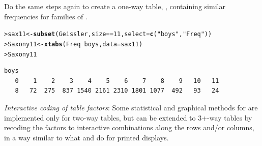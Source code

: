 \documentclass[11pt]{report}\usepackage[]{graphicx}\usepackage[]{color}
\makeatletter
\newcommand{\hlnum}[1]{\textcolor[rgb]{0.686,0.059,0.569}{#1}}%
\newcommand{\hlstr}[1]{\textcolor[rgb]{0.192,0.494,0.8}{#1}}%
\newcommand{\hlopt}[1]{\textcolor[rgb]{0,0,0}{#1}}%
\newcommand{\hlstd}[1]{\textcolor[rgb]{0.345,0.345,0.345}{#1}}%
\newcommand{\hlkwb}[1]{\textcolor[rgb]{0.69,0.353,0.396}{#1}}%
\newcommand{\hlkwc}[1]{\textcolor[rgb]{0.333,0.667,0.333}{#1}}%
\newcommand{\hlkwd}[1]{\textcolor[rgb]{0.737,0.353,0.396}{\textbf{#1}}}%
\newenvironment{kframe}{%
 \def\at@end@of@kframe{}%
 \ifinner\ifhmode%
  \def\at@end@of@kframe{\end{minipage}}%
  \begin{minipage}{\columnwidth}%
 \fi\fi%
 \def\FrameCommand##1{\hskip\@totalleftmargin \hskip-\fboxsep
 \colorbox{shadecolor}{##1}\hskip-\fboxsep
     \hskip-\linewidth \hskip-\@totalleftmargin \hskip\columnwidth}%
 \MakeFramed {\advance\hsize-\width
   \@totalleftmargin\z@ \linewidth\hsize
   \@setminipage}}%
 {\par\unskip\endMakeFramed%
 \at@end@of@kframe}
\newenvironment{knitrout}{}{} %
\renewenvironment{knitrout}{\small\renewcommand{\baselinestretch}{.85}}{} %
\makeatother
\begin{document}
\begin{Exercises}
\begin{enumerate*}
    \item Do the same steps again to create a one-way table, ,
    containing similar frequencies for families of .
    \begin{ans}
\begin{knitrout}
\color{fgcolor}\begin{kframe}
\begin{alltt}
\hlstd{> }\hlstd{sax11} \hlkwb{<-} \hlkwd{subset}\hlstd{(Geissler, size}\hlopt{==}\hlnum{11}\hlstd{,} \hlkwc{select} \hlstd{=} \hlkwd{c}\hlstd{(}\hlstr{"boys"}\hlstd{,}\hlstr{"Freq"}\hlstd{))}
\hlstd{> }\hlstd{Saxony11} \hlkwb{<-} \hlkwd{xtabs}\hlstd{(Freq}\hlopt{~}\hlstd{boys,} \hlkwc{data}\hlstd{=sax11)}
\hlstd{> }\hlstd{Saxony11}
\end{alltt}
\begin{verbatim}
boys
   0    1    2    3    4    5    6    7    8    9   10   11 
   8   72  275  837 1540 2161 2310 1801 1077  492   93   24 
\end{verbatim}
\end{kframe}
\end{knitrout}
    \end{ans}
    
  \end{enumerate*}

\exercise\exhard \emph{Interactive coding of table factors}:  Some statistical and graphical
methods for \ctabs are implemented only for two-way tables, but can be extended
to 3+-way tables by recoding the factors to interactive combinations along the
rows and/or columns, in a way similar to what  and 
do for printed displays.


\end{Exercises}
\end{document}
